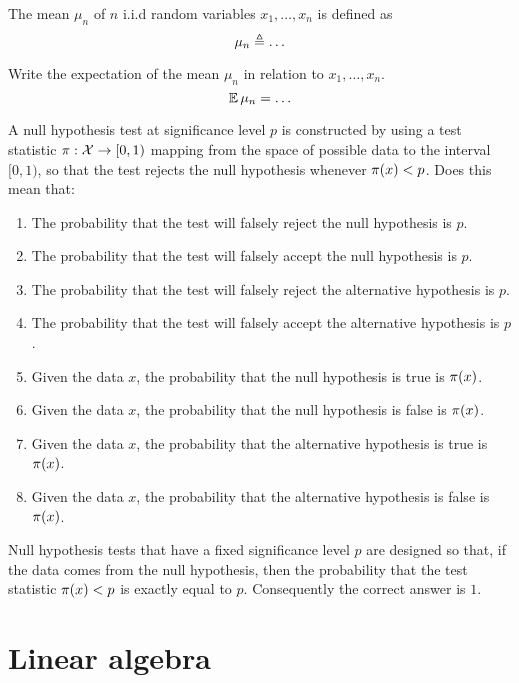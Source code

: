 \documentclass[a4paper]{article}
\begin{document}
\begin{exercise}
  The mean $\mu_n$ of $n$  i.i.d random variables $x_1, \ldots, x_n$ is defined as
  \[
  \mu_n \defn
  \ifdefined \solution
  \frac{1}{n} \sum_{i=1}^n x_i
  \else
  \ldots 
  \fi
  \]
\end{exercise}

\begin{exercise}
  Write the expectation of the mean $\mu_n$ in relation to $x_1, \ldots, x_n$.
  \[
  \E \mu_n =
  \ifdefined \solution
  \E \frac{1}{n} \sum_{i=1}^n x_i
  = \E x_i.
  \else
  \ldots
  \fi
  \]
\end{exercise}

\begin{exercise}
  A null hypothesis test at significance level $p$ is constructed by using a test statistic $\pi: {\mathcal{X}} \to [0,1)$ mapping from the space of possible data to the interval $[0,1)$, so that the test rejects the null hypothesis whenever $\pi(x) < p$. Does this mean that:
  \begin{enumerate}
  \item The probability that the test will falsely reject the null hypothesis is $p$.
  \item The probability that the test will falsely accept the null hypothesis is $p$.
  \item The probability that the test will falsely reject the alternative hypothesis is $p$.
  \item The probability that the test will falsely accept the alternative hypothesis is $p$.
  \item Given the data $x$, the probability that the null hypothesis is true is $\pi(x)$.
  \item Given the data $x$, the probability that the null hypothesis is false is $\pi(x)$.
  \item Given the data $x$, the probability that the alternative hypothesis is true is $\pi(x)$.
  \item Given the data $x$, the probability that the alternative hypothesis is false is $\pi(x)$.
  \end{enumerate}
  \end{exercise}
  \ifdefined \solution
  Null hypothesis tests that have a fixed significance level $p$ are designed so that, if the data comes from the null hypothesis, then the probability that the test statistic $\pi(x) < p$ is exactly equal to $p$. Consequently the correct answer is $1$.
  \fi
\section{Linear algebra}
\end{document}
